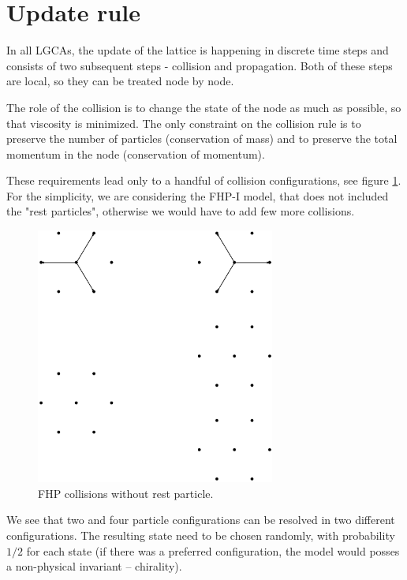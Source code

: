 \section{Update rule}
In all LGCAs, the update of the lattice is happening in discrete time steps and consists of two subsequent steps - collision and propagation. Both of these steps are local, so they can be treated node by node.

The role of the collision is to change the state of the node as much as possible, so that viscosity is minimized.
The only constraint on the collision rule is to preserve the number of particles (conservation of mass) and to preserve the total momentum in the node (conservation of momentum).

These requirements lead only to a handful of collision configurations, see figure \ref{FHPcol}. For the simplicity, we are considering the FHP-I model, that does not included the "rest particles", otherwise we would have to add few more collisions.

\begin{figure}[H]
 \centering
 \includegraphics[width=0.7\textwidth]{./img/FHPcol}
 \caption{FHP collisions without rest particle.}
 \label{FHPcol}
\end{figure}

We see that two and four particle configurations can be resolved in two different configurations. The resulting state need to be chosen randomly, with probability $1/2$ for each state (if there was a preferred configuration, the model would posses a non-physical invariant -- chirality).

